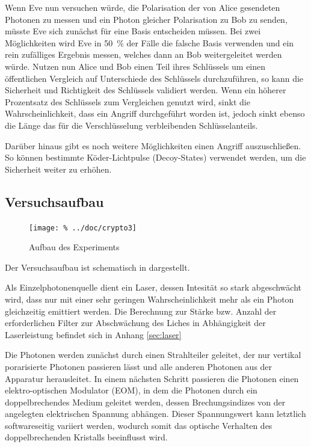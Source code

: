 Wenn Eve nun versuchen würde, die Polarisation der von Alice gesendeten Photonen
zu messen und ein Photon gleicher Polarisation zu Bob zu senden, müsste Eve
sich zunächst für eine Basis entscheiden müssen. Bei zwei Möglichkeiten wird
Eve in \SI{50}{\percent} der Fälle die falsche Basis verwenden und ein rein
zufälliges Ergebnis messen, welches dann an Bob weitergeleitet werden würde.
Nutzen nun Alice und Bob einen Teil ihres Schlüssels um einen öffentlichen
Vergleich auf Unterschiede des Schlüssels durchzuführen, so kann die Sicherheit
und Richtigkeit des Schlüssels validiert werden. Wenn ein höherer Prozentsatz
des Schlüssels zum Vergleichen genutzt wird, sinkt die Wahrscheinlichkeit, dass
ein Angriff durchgeführt worden ist, jedoch sinkt ebenso die Länge das für die
Verschlüsselung verbleibenden Schlüsselanteils.

Darüber hinaus gibt es noch weitere Möglichkeiten einen Angriff auszuschließen.
So können bestimmte Köder-Lichtpulse (Decoy-States) verwendet werden, um die
Sicherheit weiter zu erhöhen.

\subsection{Versuchsaufbau}

\begin{figure}[htb]
 \centering
 \texttt{[image: \%
  ../doc/crypto3]}
 \caption{Aufbau des Experiments}
 \label{fig:aufbau}
\end{figure}

Der Versuchsaufbau ist schematisch in  dargestellt.

Als Einzelphotonenquelle dient ein Laser, dessen Intesität so stark abgeschwächt
wird, dass nur mit einer sehr geringen Wahrscheinlichkeit mehr als ein Photon
gleichzeitig emittiert werden. Die Berechnung zur Stärke bzw. Anzahl der
erforderlichen Filter zur Abschwächung des Liches in Abhängigkeit der
Laserleistung befindet sich in Anhang \ref{sec:laser}

Die Photonen werden zunächst durch einen Strahlteiler geleitet, der nur vertikal
porarisierte Photonen passieren lässt und alle anderen Photonen aus der Apparatur
herausleitet. In einem nächsten Schritt passieren die Photonen einen 
elektro-optischen Modulator (EOM), in dem die Photonen durch ein
doppelbrechendes Medium geleitet werden, dessen Brechungsindizes von der
angelegten elektrischen Spannung abhängen. Dieser Spannungswert kann letztlich
softwareseitig variiert werden, wodurch somit das optische Verhalten des
doppelbrechenden Kristalls beeinflusst wird.

